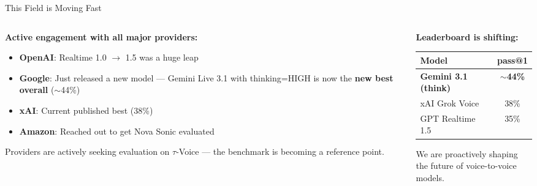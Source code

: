 \documentclass[aspectratio=169]{beamer}
\newcommand{\tauvoice}{$\tau$-Voice}
\begin{document}
\begin{frame}{This Field is Moving Fast}

  \begin{columns}[T]
    \begin{column}{0.55\textwidth}
      \textbf{Active engagement with all major providers:}

      \vspace{0.5em}
      \begin{itemize}
        \item \textbf{OpenAI}: Realtime 1.0 $\rightarrow$ 1.5 was a huge leap
        \item \textbf{Google}: Just released a new model --- Gemini Live 3.1 with thinking=HIGH is now the \textbf{new best overall} ($\sim$44\%)
        \item \textbf{xAI}: Current published best (38\%)
        \item \textbf{Amazon}: Reached out to get Nova Sonic evaluated
      \end{itemize}

      \vspace{0.5em}
      {\small Providers are actively seeking evaluation on \tauvoice{} --- the benchmark is becoming a reference point.}
    \end{column}
    \begin{column}{0.43\textwidth}
      \textbf{Leaderboard is shifting:}

      \vspace{0.5em}
      \begin{small}
      \begin{tabular}{@{}lc@{}}
        \toprule
        \textbf{Model} & \textbf{pass@1} \\
        \midrule
        \textcolor{SierraOrange}{\textbf{Gemini 3.1 (think)}} & \textcolor{SierraOrange}{\textbf{$\sim$44\%}} \\
        xAI Grok Voice & 38\% \\
        GPT Realtime 1.5 & 35\% \\
        \bottomrule
      \end{tabular}
      \end{small}

      \vspace{1.5em}
      {
      \setlength{\fboxsep}{8pt}
      \colorbox{SierraDarkGreen}{%
        \parbox{0.9\linewidth}{\centering\textcolor{SierraWhite}{\intermedium We are proactively shaping\\the future of voice-to-voice models.}}%
      }
      }
    \end{column}
  \end{columns}

\end{frame}
\end{document}
